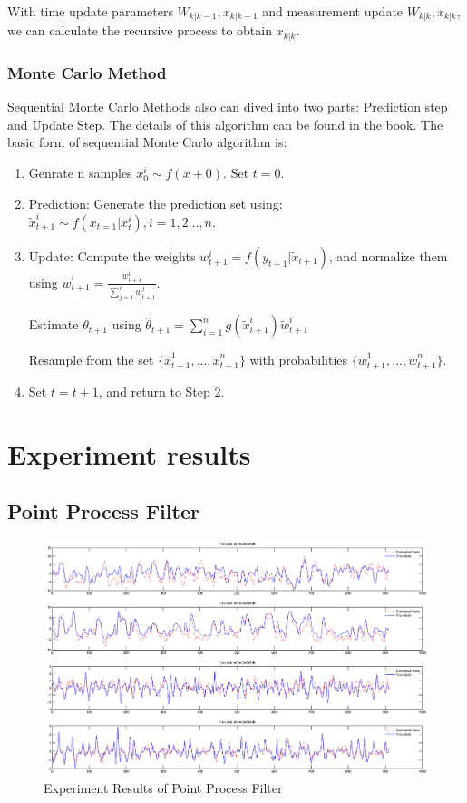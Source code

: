 \documentclass[12pt,letterpaper]{article}
\begin{document}
With time update parameters $W_{k|k-1}, x_{k|k-1}$ and measurement update $W_{k|k}, x_{k|k}$, we can calculate the recursive process to obtain $x_{k|k}$. 

\subsubsection {Monte Carlo Method}

Sequential Monte Carlo Methods also can dived into two parts: Prediction step and Update Step. The details of this algorithm can be found in the book. The basic form of sequential Monte Carlo algorithm is:

\begin{enumerate}
\item Genrate n samples $x_0^i \sim f(x+0).$ Set $t=0$.

\item Prediction: Generate the prediction set using: $\tilde{x}_{t+1}^i \sim f(x_{t=1}|x^i_t),i=1,2...,n.$

\item Update: Compute the weights $w^i_{t+1} = f(y_{t+1}|\tilde{x}_{t+1})$, and normalize them using $\tilde{w}^i_{t+1} = \frac{w^i_{t+1}}{\sum_{j=1}^n{w^j_{t+1}}}$. 

Estimate $\theta_{t+1}$ using $ \hat {\theta}_{t+1} = \sum_{i=1}^n{g(\tilde{x}^i_{i+1})\tilde{w}^i_{t+1}}$  

Resample from the set $\{\tilde{x}_{t+1}^1,...,\tilde{x}^n_{t+1} \}$ with probabilities $\{ \tilde{w}^1_{t+1},..., \tilde{w}^n_{t+1} \}$. 


\item Set $t=t+1$, and return to Step 2. 

\end{enumerate}

\section{Experiment results}
\subsection{Point Process Filter}

\begin{figure}
\begin{center}
\includegraphics[width=0.9\linewidth]{PointPF.eps}
\caption{Experiment Results of Point Process Filter}
\label{fig:database}
\end{center}
\end{figure}
\end{document}
